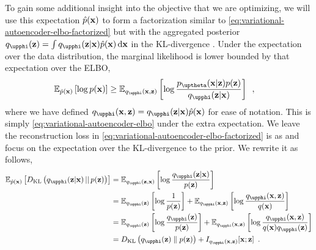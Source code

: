 To gain some additional insight into the objective that we are optimizing, we will use this expectation $\hat{p}({\mathbf{x}})$ to form a factorization similar to \cref{eq:variational-autoencoder-elbo-factorized} but with the aggregated posterior $q_\phib(\zb) = \int q_\phib(\zb|\xb)\hat{p}(\xb)\,\mathrm{d}\xb$ in the KL-divergence \parencite{tomczak_trouble_2022}. 
Under the expectation over the data distribution, the marginal likelihood is lower bounded by that expectation over the ELBO,
%
\begin{align} \label{eq:variational-autoencoder-elbo-expected}
    \mathbb{E}_{\hat{p}(\xb)}\left[ \log p(\xb) \right] 
    &\geq \mathbb{E}_{q_{\phib}(\xb,\zb)}\left[ \log \frac{p_{\thetab}(\xb|\zb)p(\zb)}{q_{\phib}(\zb|\xb)} \right] \enspace ,
\end{align}
%
where we have defined $q_{\phib}(\xb,\zb) = q_{\phib}(\zb|\xb)\hat{p}(\xb)$ for ease of notation. This is simply \cref{eq:variational-autoencoder-elbo} under the extra expectation. 
We leave the reconstruction loss in \cref{eq:variational-autoencoder-elbo-factorized} is as and focus on the expectation over the KL-divergence to the prior. We rewrite it as follows,
%
\begin{align} \label{eq:variational-autoencoder-kl-factor-expected}
    \mathbb{E}_{\hat{p}(\xb)} \left[ D_\text{KL}\left( q_{\phib}(\zb|\xb) \,||\, p(\zb) \right) \right]
    &= \mathbb{E}_{q_{\phib}(\zb,\xb)} \left[ \log \frac{q_{\phib}(\zb|\xb)}{p(\zb)}\right] \nonumber \\
    &= \mathbb{E}_{q_{\phib}(\zb)}\left[ \log \frac{1}{p(\zb)} \right] + \mathbb{E}_{q_{\phib}(\xb,\zb)}\left[ \log \frac{q_{\phib}(\xb,\zb)}{q(\xb)} \right] \nonumber \\
    &= \mathbb{E}_{q_{\phib}(\zb)}\left[ \log \frac{q_{\phib}(\zb)}{p(\zb)} \right] + \mathbb{E}_{q_{\phib}(\xb,\zb)}\left[ \log \frac{q_{\phib}(\xb,\zb)}{q(\xb)q_{\phib}(\zb)} \right] \nonumber \\
    &= D_\mathrm{KL}\left( q_{\phib}(\zb) \parallel p(\zb) \right) + I_{q_{\phib}(\xb,\zb)}[\xb;\zb] \enspace .
\end{align}
